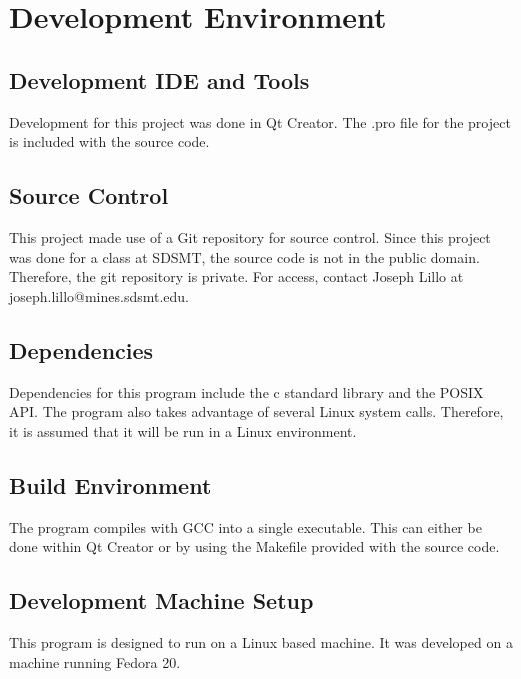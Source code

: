\chapter{Development Environment}

\section{Development IDE and Tools}
Development for this project was done in Qt Creator. The .pro file for the project is included with the source code.

\section{Source  Control}
This project made use of a Git repository for source control. Since this project was done for a class at SDSMT, the source code is not in the public domain. Therefore, the git repository is private. For access, contact Joseph Lillo at joseph.lillo@mines.sdsmt.edu. 

\section{Dependencies}
Dependencies for this program include the c standard library and the POSIX API. The program also takes advantage of several Linux system calls. Therefore, it is assumed that it will be run in a Linux environment.

\section{Build  Environment}
The program compiles with GCC into a single executable. This can either be done within Qt Creator or by using the Makefile provided with the source code. 

\section{Development Machine Setup}
This program is designed to run on a Linux based machine.
It was developed on a machine running Fedora 20.

